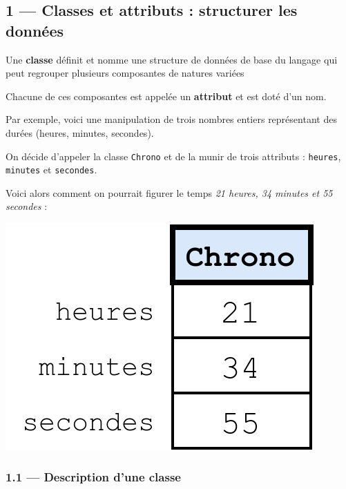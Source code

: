 \documentclass[a4paper,17pt]{extarticle}
\begin{document}
    \hypertarget{classes-et-attributs-structurer-les-donnuxe9es}{%
\subsection{1 --- Classes et attributs : structurer les
données}\label{classes-et-attributs-structurer-les-donnuxe9es}}
\begin{retenir}
    Une \textbf{classe} définit et nomme une structure de données de base du
langage qui peut regrouper plusieurs composantes de natures variées

        \end{retenir}\begin{retenir}
    Chacune de ces composantes est appelée un \textbf{attribut} et est doté
d'un nom.

        \end{retenir}\begin{exemple}
    Par exemple, voici une manipulation de trois nombres entiers
représentant des durées (heures, minutes, secondes).

On décide d'appeler la classe \texttt{Chrono} et de la munir de trois
attributs : \texttt{heures}, \texttt{minutes} et \texttt{secondes}.

Voici alors comment on pourrait figurer le temps \emph{21 heures, 34
minutes et 55 secondes} :

\includegraphics{res/chrono00.png}

        \end{exemple}
    \hypertarget{description-dune-classe}{%
\subsubsection{1.1 --- Description d'une
classe}\label{description-dune-classe}}
\end{document}
